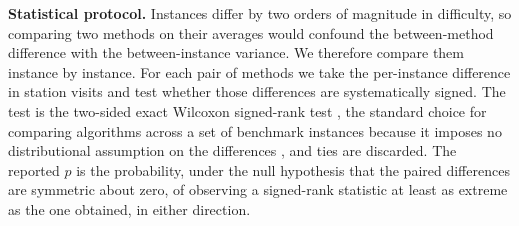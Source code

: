 \documentclass[]{interact}
\begin{document}
\textbf{Statistical protocol.} Instances differ by two orders of magnitude in difficulty, so comparing two methods on their averages would confound the between-method difference with the between-instance variance. We therefore compare them instance by instance. For each pair of methods we take the per-instance difference in station visits and test whether those differences are systematically signed. The test is the two-sided exact Wilcoxon signed-rank test \citep{wilcoxon1945}, the standard choice for comparing algorithms across a set of benchmark instances because it imposes no distributional assumption on the differences \citep{demsar2006}, and ties are discarded. The reported $p$ is the probability, under the null hypothesis that the paired differences are symmetric about zero, of observing a signed-rank statistic at least as extreme as the one obtained, in either direction.
\end{document}
